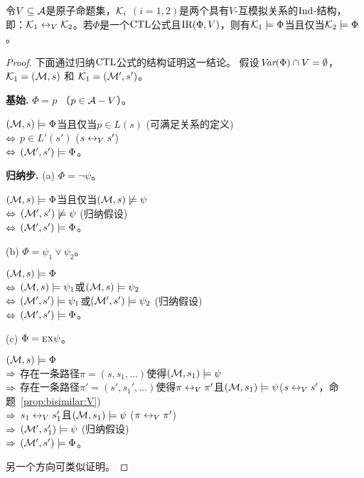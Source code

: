 \begin{theorem}\label{thm:V-bisimulation:EQ}
	令$V\subseteq {\cal A}$是原子命题集，${\cal K}_i$ $(i=1,2)$是两个具有$V$-互模拟关系的$\textrm{Ind}$-结构，即：${\cal K}_1 \leftrightarrow_V {\cal K}_2$。若$\Phi$是一个$\textrm{CTL}$公式且$\textrm{IR}(\Phi, V)$，则有${\cal K}_1\models \Phi$当且仅当${\cal K}_2\models \Phi$。
\end{theorem}
\begin{proof}
	下面通过归纳$\textrm{CTL}$公式的结构证明这一结论。
	假设$\textit{Var}(\Phi) \cap V=\emptyset$，${\cal K}_1=({\cal M},s)$ 和 ${\cal K}_1=({\cal M}',s')$。
	
	\textbf{基始.} $\Phi = p$ （$p\in {\cal A} -V$）。
	
	$({\cal M},s)\models \Phi$当且仅当$p\in L(s)$ \hfill (可满足关系的定义)\\
	$\Leftrightarrow$ $p\in L'(s')$ \hfill ($s \leftrightarrow_V s'$)\\
	$\Leftrightarrow$ $({\cal M}',s') \models \Phi$。
	
	\textbf{归纳步.} (a) $\Phi = \neg \psi$。
	
	$({\cal M},s)\models \Phi$当且仅当$({\cal M},s) \not \models \psi$\\
	$\Leftrightarrow$ $({\cal M}',s')\not \models \psi$  \hfill (归纳假设)\\
	$\Leftrightarrow$ $({\cal M}',s') \models \Phi$。
	
	(b) $\Phi = \psi_1 \vee \psi_2$。
	
	$({\cal M},s)\models \Phi$\\
	$\Leftrightarrow$ $({\cal M},s) \models \psi_1$或$({\cal M},s) \models \psi_2$\\
	$\Leftrightarrow$ $({\cal M}',s')  \models \psi_1$或$({\cal M}',s') \models \psi_2$ \hfill (归纳假设)\\
	$\Leftrightarrow$ $({\cal M}',s') \models \Phi$。
	
	(c) $\Phi=\textsc{e}\textsc{x}\psi$。
	
	$({\cal M},s)\models \Phi$\\
	$\Rightarrow$ 存在一条路径$\pi=(s,s_1,\dots)$使得$({\cal M},s_1)\models \psi$\\
	$\Rightarrow$ 存在一条路径$\pi'=(s',s_1',\dots)$使得$\pi \leftrightarrow_V \pi'$且$({\cal M},s_1)\models \psi$\hfill ($s \leftrightarrow_V s'$，命题~\ref{prop:bisimilar:V})\\
	$\Rightarrow$ $s_1 \leftrightarrow_V s_1'$且$({\cal M},s_1)\models \psi$ \hfill ($\pi \leftrightarrow_V \pi'$)\\
	$\Rightarrow$ $({\cal M}',s_1') \models \psi$   \hfill   (归纳假设)\\
	$\Rightarrow$ $({\cal M}',s')\models \Phi$。
	
	另一个方向可类似证明。
	

\end{proof}
